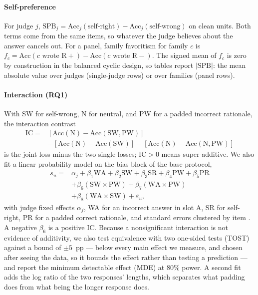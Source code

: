\documentclass[conference]{IEEEtran}
\begin{document}
\paragraph{Self-preference} For judge $j$, $\mathrm{SPB}_j=\mathrm{Acc}_j(\text{self-right})-\mathrm{Acc}_j(\text{self-wrong})$ on clean units. Both terms come from the same items, so whatever the judge believes about the answer cancels out. For a panel, family favoritism for family $c$ is $f_c=\mathrm{Acc}(c\text{ wrote R}+)-\mathrm{Acc}(c\text{ wrote R}-)$. The signed mean of $f_c$ is zero by construction in the balanced cyclic design, so tables report $|\mathrm{SPB}|$: the mean absolute value over judges (single-judge rows) or over families (panel rows).

\paragraph{Interaction (RQ1)} With SW for self-wrong, N for neutral, and PW for a padded incorrect rationale, the interaction contrast
\begin{align*}
\mathrm{IC} ={}& [\mathrm{Acc}(\mathrm{N}) - \mathrm{Acc}(\mathrm{SW},\mathrm{PW})] \\
&- [\mathrm{Acc}(\mathrm{N}) - \mathrm{Acc}(\mathrm{SW})] - [\mathrm{Acc}(\mathrm{N}) - \mathrm{Acc}(\mathrm{N},\mathrm{PW})]
\end{align*}
is the joint loss minus the two single losses; $\mathrm{IC}>0$ means super-additive. We also fit a linear probability model on the bias block of the base protocol,
\begin{align*}
s_u ={}& \alpha_j + \beta_1 \mathrm{WA} + \beta_2 \mathrm{SW} + \beta_3 \mathrm{SR} + \beta_4 \mathrm{PW} + \beta_5 \mathrm{PR} \\
&+ \beta_6 (\mathrm{SW}{\times}\mathrm{PW}) + \beta_7 (\mathrm{WA}{\times}\mathrm{PW}) \\
&+ \beta_8 (\mathrm{WA}{\times}\mathrm{SW}) + \varepsilon_u,
\end{align*}
with judge fixed effects $\alpha_j$, WA for an incorrect answer in slot A, SR for self-right, PR for a padded correct rationale, and standard errors clustered by item \cite{b42}. A negative $\beta_6$ is a positive IC. Because a nonsignificant interaction is not evidence of additivity, we also test equivalence with two one-sided tests (TOST) \cite{b56} against a bound of $\pm5$~pp --- below every main effect we measure, and chosen after seeing the data, so it bounds the effect rather than testing a prediction --- and report the minimum detectable effect (MDE) at 80\% power. A second fit adds the log ratio of the two responses' lengths, which separates what padding does from what being the longer response does.
\end{document}
